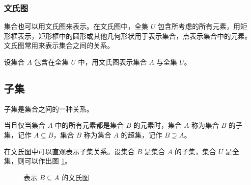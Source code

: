 \subsubsection{文氏图}
集合也可以用文氏图来表示。在文氏图中，全集 $U$ 包含所考虑的所有元素，用矩形框表示，矩形框中的圆形或其他几何形状用于表示集合，点表示集合中的元素。文氏图常用来表示集合之间的关系。
\begin{collections}
    \begin{example}
        设集合 $A$ 包含在全集 $U$ 中，用文氏图表示集合 $A$ 与全集 $U$。
    \end{example}
    \begin{solution}
        \begin{center}
        \end{center}
    \end{solution}
\end{collections}

\subsection{子集}
子集是集合之间的一种关系。
\begin{definition}[子集与超集]\label{def:子集与超集}
    当且仅当集合 $A$ 中的所有元素都是集合 $B$ 的元素时，集合 $A$ 称为集合 $B$ 的子集，记作 $A \subseteq B$，集合 $B$ 称为集合 $A$ 的超集，记作 $B \supseteq A$。
\end{definition}

在文氏图中可以直观表示子集关系。设集合 $B$ 是集合 $A$ 的子集，集合 $U$ 是全集，则可以作出图 \ref{fig:子集文氏图}。
\begin{figure}[htbp!]
    \centering
    \caption{表示 $B \subseteq A$ 的文氏图}
    \label{fig:子集文氏图}
\end{figure}

